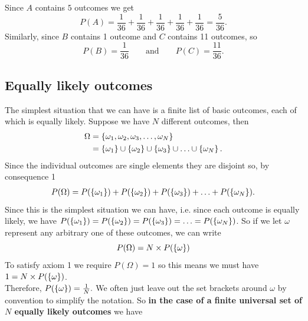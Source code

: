 \noindent Since $A$ contains $5$ outcomes we get 
\[
P(A) = \frac{1}{36} + \frac{1}{36} + \frac{1}{36} + \frac{1}{36} + \frac{1}{36} = \frac{5}{36}.
\]
Similarly, since $B$ contains 1 outcome and $C$ contains 11 outcomes, so
\[
P(B) = \frac{1}{36} \qquad \text{and} \qquad P(C) = \frac{11}{36}.
\]


\subsection{Equally likely outcomes} \label{sec222}
The simplest situation that we can have is a finite list of basic outcomes, each of which is equally likely. Suppose we have $N$ different outcomes, then
\begin{align*}
\Omega & = \left\{\omega_1,\omega_2,\omega_3,\ldots,\omega_N\right\} \\
	     & = \left\{\omega_1\right\} \cup \left\{\omega_2\right\} \cup \left\{\omega_3\right\} \cup \ldots \cup \left\{\omega_N\right\}.
\end{align*}
Since the individual outcomes are single elements they are disjoint so, by consequence 1
\begin{align*}
P(\Omega) = P(\left\{\omega_1\right\}) + P(\left\{\omega_2\right\}) + P(\left\{\omega_3\right\}) + \ldots + P(\left\{\omega_N\right\}).
\end{align*}
Since this is the simplest situation we can have, i.e. since each outcome is equally likely, we have $ P(\left\{\omega_1\right\}) = P(\left\{\omega_2\right\}) = P(\left\{\omega_3\right\}) = \ldots = P(\left\{\omega_N\right\})$. So if we let $\omega$ represent any arbitrary one of these outcomes, we can write
\[
P(\Omega) = N\times P(\left\{\omega\right\})
\]
To satisfy axiom 1 we require $P(\Omega) = 1$ so this means we must have $1 = N\times P(\left\{\omega\right\})$. \\ Therefore, $P(\left\{\omega\right\}) = \frac{1}{N}.$ We often just leave out the set brackets around $\omega$ by convention to simplify the notation. So \textbf{in the case of a finite universal set of $N$ equally likely outcomes} we have

  	\bigskip
	
	\hfil{}
	\bigskip
	\bigskip
	
